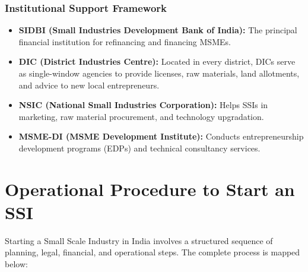 \documentclass[12pt,a4paper]{article}
\begin{document}
\subsubsection{Institutional Support Framework}
\begin{itemize}[leftmargin=*, itemsep=3pt]
  \item \textbf{SIDBI (Small Industries Development Bank of India):} The principal financial institution for refinancing and financing MSMEs.
  \item \textbf{DIC (District Industries Centre):} Located in every district, DICs serve as single-window agencies to provide licenses, raw materials, land allotments, and advice to new local entrepreneurs.
  \item \textbf{NSIC (National Small Industries Corporation):} Helps SSIs in marketing, raw material procurement, and technology upgradation.
  \item \textbf{MSME-DI (MSME Development Institute):} Conducts entrepreneurship development programs (EDPs) and technical consultancy services.
\end{itemize}

\section{Operational Procedure to Start an SSI}

Starting a Small Scale Industry in India involves a structured sequence of planning, legal, financial, and operational steps. The complete process is mapped below:
\end{document}
